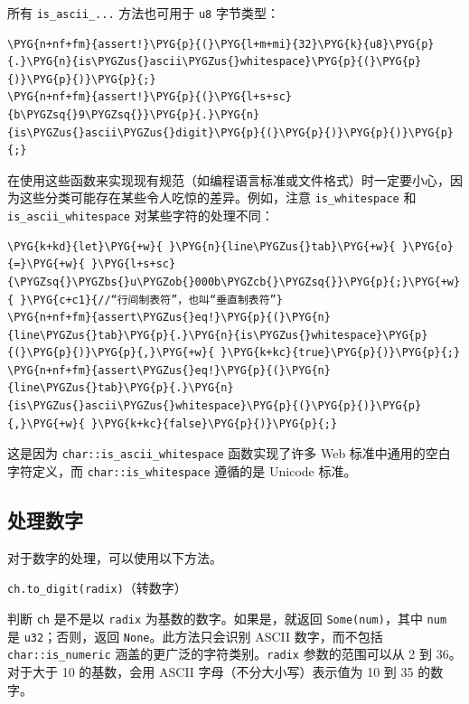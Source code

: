 所有 \texttt{is\_ascii\_...} 方法也可用于 \texttt{u8} 字节类型：

\begin{Verbatim}[commandchars=\\\{\},breaklines=true,breakanywhere=true,fontsize=\codefont,xleftmargin=17bp]
\PYG{n+nf+fm}{assert!}\PYG{p}{(}\PYG{l+m+mi}{32}\PYG{k}{u8}\PYG{p}{.}\PYG{n}{is\PYGZus{}ascii\PYGZus{}whitespace}\PYG{p}{(}\PYG{p}{)}\PYG{p}{)}\PYG{p}{;}
\PYG{n+nf+fm}{assert!}\PYG{p}{(}\PYG{l+s+sc}{b\PYGZsq{}9\PYGZsq{}}\PYG{p}{.}\PYG{n}{is\PYGZus{}ascii\PYGZus{}digit}\PYG{p}{(}\PYG{p}{)}\PYG{p}{)}\PYG{p}{;}
\end{Verbatim}

在使用这些函数来实现现有规范（如编程语言标准或文件格式）时一定要小心，因为这些分类可能存在某些令人吃惊的差异。例如，注意 \texttt{is\_whitespace} 和 \texttt{is\_ascii\_whitespace} 对某些字符的处理不同：

\begin{Verbatim}[commandchars=\\\{\},breaklines=true,breakanywhere=true,fontsize=\codefont,xleftmargin=17bp]
\PYG{k+kd}{let}\PYG{+w}{ }\PYG{n}{line\PYGZus{}tab}\PYG{+w}{ }\PYG{o}{=}\PYG{+w}{ }\PYG{l+s+sc}{\PYGZsq{}\PYGZbs{}u\PYGZob{}000b\PYGZcb{}\PYGZsq{}}\PYG{p}{;}\PYG{+w}{ }\PYG{c+c1}{//“行间制表符”，也叫“垂直制表符”}
\PYG{n+nf+fm}{assert\PYGZus{}eq!}\PYG{p}{(}\PYG{n}{line\PYGZus{}tab}\PYG{p}{.}\PYG{n}{is\PYGZus{}whitespace}\PYG{p}{(}\PYG{p}{)}\PYG{p}{,}\PYG{+w}{ }\PYG{k+kc}{true}\PYG{p}{)}\PYG{p}{;}
\PYG{n+nf+fm}{assert\PYGZus{}eq!}\PYG{p}{(}\PYG{n}{line\PYGZus{}tab}\PYG{p}{.}\PYG{n}{is\PYGZus{}ascii\PYGZus{}whitespace}\PYG{p}{(}\PYG{p}{)}\PYG{p}{,}\PYG{+w}{ }\PYG{k+kc}{false}\PYG{p}{)}\PYG{p}{;}
\end{Verbatim}

这是因为 \texttt{char::is\_ascii\_whitespace} 函数实现了许多 Web 标准中通用的空白字符定义，而 \texttt{char::is\_whitespace} 遵循的是 Unicode 标准。

\subsection{处理数字}

对于数字的处理，可以使用以下方法。

\begin{mySidenote}
\texttt{ch.to\_digit(radix)}（转数字）
\end{mySidenote}

判断 \texttt{ch} 是不是以 \texttt{radix} 为基数的数字。如果是，就返回 \texttt{Some(num)}，其中 \texttt{num} 是 \texttt{u32}；否则，返回 \texttt{None}。此方法只会识别 ASCII 数字，而不包括 \texttt{char::is\_numeric} 涵盖的更广泛的字符类别。\texttt{radix} 参数的范围可以从 2 到 36。对于大于 10 的基数，会用 ASCII 字母（不分大小写）表示值为 10 到 35 的数字。

